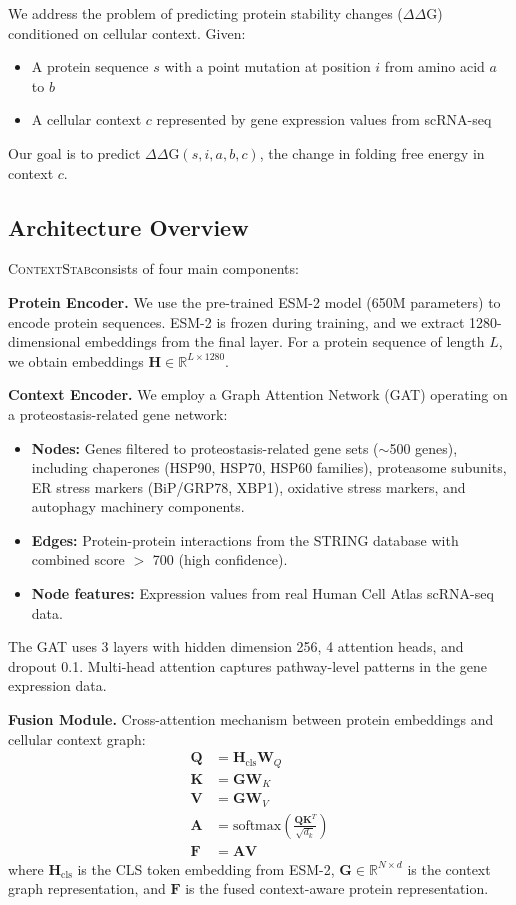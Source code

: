 \documentclass{article}
\newcommand{\contextstab}{\textsc{ContextStab}}
\begin{document}
We address the problem of predicting protein stability changes ($\Delta\Delta$G) conditioned on cellular context. Given:
\begin{itemize}
    \item A protein sequence $s$ with a point mutation at position $i$ from amino acid $a$ to $b$
    \item A cellular context $c$ represented by gene expression values from scRNA-seq
\end{itemize}
Our goal is to predict $\Delta\Delta$G$(s, i, a, b, c)$, the change in folding free energy in context $c$.

\subsection{Architecture Overview}

\contextstab consists of four main components:

\textbf{Protein Encoder.} We use the pre-trained ESM-2 model (650M parameters) \citep{lin2023esm2} to encode protein sequences. ESM-2 is frozen during training, and we extract 1280-dimensional embeddings from the final layer. For a protein sequence of length $L$, we obtain embeddings $\mathbf{H} \in \mathbb{R}^{L \times 1280}$.

\textbf{Context Encoder.} We employ a Graph Attention Network (GAT) \citep{velivckovic2018graph} operating on a proteostasis-related gene network:
\begin{itemize}
    \item \textbf{Nodes:} Genes filtered to proteostasis-related gene sets ($\sim$500 genes), including chaperones (HSP90, HSP70, HSP60 families), proteasome subunits, ER stress markers (BiP/GRP78, XBP1), oxidative stress markers, and autophagy machinery components.
    \item \textbf{Edges:} Protein-protein interactions from the STRING database \citep{szklarczyk2019string} with combined score $>$ 700 (high confidence).
    \item \textbf{Node features:} Expression values from real Human Cell Atlas scRNA-seq data.
\end{itemize}
The GAT uses 3 layers with hidden dimension 256, 4 attention heads, and dropout 0.1. Multi-head attention captures pathway-level patterns in the gene expression data.

\textbf{Fusion Module.} Cross-attention mechanism between protein embeddings and cellular context graph:
\begin{align}
\mathbf{Q} &= \mathbf{H}_{\text{cls}} \mathbf{W}_Q \\
\mathbf{K} &= \mathbf{G} \mathbf{W}_K \\
\mathbf{V} &= \mathbf{G} \mathbf{W}_V \\
\mathbf{A} &= \text{softmax}\left(\frac{\mathbf{Q}\mathbf{K}^T}{\sqrt{d_k}}\right) \\
\mathbf{F} &= \mathbf{A}\mathbf{V}
\end{align}
where $\mathbf{H}_{\text{cls}}$ is the CLS token embedding from ESM-2, $\mathbf{G} \in \mathbb{R}^{N \times d}$ is the context graph representation, and $\mathbf{F}$ is the fused context-aware protein representation.
\end{document}
